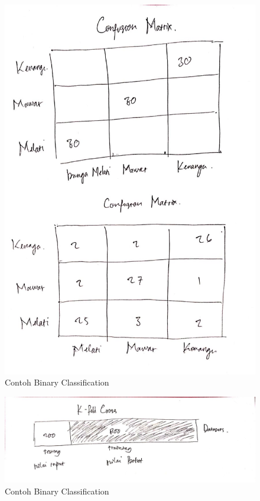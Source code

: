 \begin{figure}[ht]
      \centerline{\includegraphics[width=1\textwidth]
      {figures/c15}}
      \caption{Contoh Binary Classification}
      \label{c15}
      \end{figure}

\begin{figure}[ht]
      \centerline{\includegraphics[width=1\textwidth]
      {figures/c16}}
      \caption{Contoh Binary Classification}
      \label{c16}
      \end{figure}

